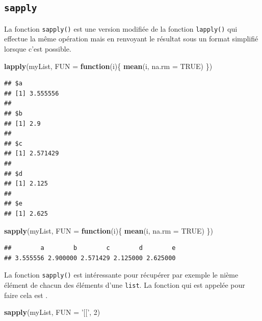 \documentclass[
]{book}
\newenvironment{Shaded}{\begin{snugshade}}{\end{snugshade}}
\newcommand{\ControlFlowTok}[1]{\textcolor[rgb]{0.13,0.29,0.53}{\textbf{#1}}}
\newcommand{\DataTypeTok}[1]{\textcolor[rgb]{0.13,0.29,0.53}{#1}}
\newcommand{\DecValTok}[1]{\textcolor[rgb]{0.00,0.00,0.81}{#1}}
\newcommand{\KeywordTok}[1]{\textcolor[rgb]{0.13,0.29,0.53}{\textbf{#1}}}
\newcommand{\NormalTok}[1]{#1}
\newcommand{\OtherTok}[1]{\textcolor[rgb]{0.56,0.35,0.01}{#1}}
\newcommand{\StringTok}[1]{\textcolor[rgb]{0.31,0.60,0.02}{#1}}
\begin{document}
\hypertarget{l17lapply}{%
\subsection{\texorpdfstring{\texttt{sapply}}{sapply}}\label{l17lapply}}

La fonction \texttt{sapply()} est une version modifiée de la fonction \texttt{lapply()} qui effectue la même opération mais en renvoyant le résultat sous un format simplifié lorsque c'est possible.

\begin{Shaded}
\begin{Highlighting}[]
\KeywordTok{lapply}\NormalTok{(myList, }\DataTypeTok{FUN =} \ControlFlowTok{function}\NormalTok{(i)\{}
  \KeywordTok{mean}\NormalTok{(i, }\DataTypeTok{na.rm =} \OtherTok{TRUE}\NormalTok{)}
\NormalTok{\})}
\end{Highlighting}
\end{Shaded}

\begin{verbatim}
## $a
## [1] 3.555556
## 
## $b
## [1] 2.9
## 
## $c
## [1] 2.571429
## 
## $d
## [1] 2.125
## 
## $e
## [1] 2.625
\end{verbatim}

\begin{Shaded}
\begin{Highlighting}[]
\KeywordTok{sapply}\NormalTok{(myList, }\DataTypeTok{FUN =} \ControlFlowTok{function}\NormalTok{(i)\{}
  \KeywordTok{mean}\NormalTok{(i, }\DataTypeTok{na.rm =} \OtherTok{TRUE}\NormalTok{)}
\NormalTok{\})}
\end{Highlighting}
\end{Shaded}

\begin{verbatim}
##        a        b        c        d        e 
## 3.555556 2.900000 2.571429 2.125000 2.625000
\end{verbatim}

La fonction \texttt{sapply()} est intéressante pour récupérer par exemple le nième élément de chacun des éléments d'une \texttt{list}. La fonction qui est appelée pour faire cela est \texttt{\textquotesingle{}{[}{[}\textquotesingle{}}.

\begin{Shaded}
\begin{Highlighting}[]
\KeywordTok{sapply}\NormalTok{(myList, }\DataTypeTok{FUN =} \StringTok{'[['}\NormalTok{, }\DecValTok{2}\NormalTok{)}
\end{Highlighting}
\end{Shaded}
\end{document}
